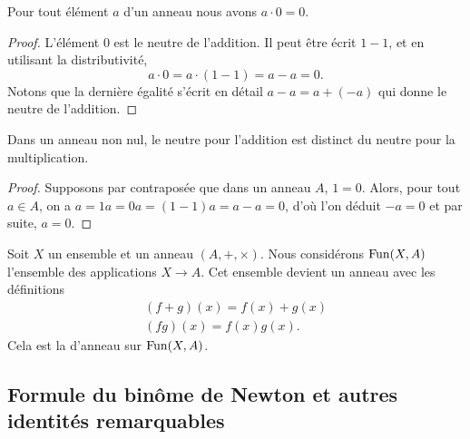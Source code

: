 \begin{lemma}       \label{LEMooVUSMooWisQpD}
    Pour tout élément \( a\) d'un anneau nous avons \( a\cdot 0=0\).
\end{lemma}

\begin{proof}
    L'élément \( 0\) est le neutre de l'addition. Il peut être écrit \( 1-1\), et en utilisant la distributivité,
    \begin{equation}
        a\cdot 0=a\cdot (1-1)=a-a=0.
    \end{equation}
    Notons que la dernière égalité s'écrit en détail \( a-a=a+(-a)\) qui donne le neutre de l'addition.
\end{proof}

\begin{proposition}     \label{PROPooNCCGooXjVyVt}
    Dans un anneau non nul, le neutre pour l'addition est distinct du neutre pour la multiplication.
\end{proposition}
\begin{proof}
    Supposons par contraposée que dans un anneau $A$, \( 1 = 0 \). Alors, pour tout \( a \in A \), on a \( a = 1a = 0a = (1 - 1)a = a - a=0 \), d'où l'on déduit \( -a = 0  \) et par suite, \( a = 0. \)
\end{proof}

\begin{normaltext}
Soit \( X\) un ensemble et un anneau $(A, +, \times)$. Nous considérons \( \operatorname{Fun}(X,A)\) l'ensemble des applications \( X\to A\). Cet ensemble devient un anneau avec les définitions
\begin{subequations}
    \begin{align}
        (f+g)(x)=f(x)+g(x)\\
        (fg)(x)=f(x)g(x).
    \end{align}
\end{subequations}
Cela est la  d'anneau sur \( \operatorname{Fun}(X,A)\).
\end{normaltext}

\subsection{Formule du binôme de Newton et autres identités remarquables}

